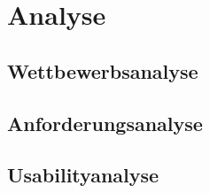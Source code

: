 \chapter{Analyse}
\label{ch:analysis}

\section{Wettbewerbsanalyse}
\label{sec:competitionanalysis}

\section{Anforderungsanalyse}
\label{sec:requirementanalysis}

\section{Usabilityanalyse}
\label{sec:usabilityanalysis}

